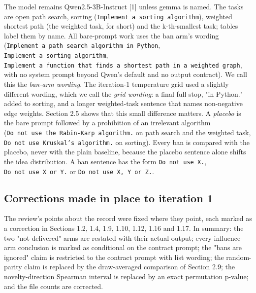 \documentclass[11pt,letterpaper]{article}
\begin{document}
The model remains Qwen2.5-3B-Instruct [1] unless gemma is named. The tasks are open path search, sorting (\texttt{Implement\ a\ sorting\ algorithm}), weighted shortest path (the weighted task, for short) and the k-th-smallest task; tables label them by name. All bare-prompt work uses the ban arm's wording (\texttt{Implement\ a\ path\ search\ algorithm\ in\ Python}, \texttt{Implement\ a\ sorting\ algorithm}, \texttt{Implement\ a\ function\ that\ finds\ a\ shortest\ path\ in\ a\ weighted\ graph}, with no system prompt beyond Qwen's default and no output contract). We call this the \emph{ban-arm wording}. The iteration-1 temperature grid used a slightly different wording, which we call the \emph{grid wording}: a final full stop, "in Python." added to sorting, and a longer weighted-task sentence that names non-negative edge weights. Section 2.5 shows that this small difference matters. A \emph{placebo} is the bare prompt followed by a prohibition of an irrelevant algorithm (\texttt{Do\ not\ use\ the\ Rabin-Karp\ algorithm.} on path search and the weighted task, \texttt{Do\ not\ use\ Kruskal's\ algorithm.} on sorting). Every ban is compared with the placebo, never with the plain baseline, because the placebo sentence alone shifts the idea distribution. A ban sentence has the form \texttt{Do\ not\ use\ X.}, \texttt{Do\ not\ use\ X\ or\ Y.} or \texttt{Do\ not\ use\ X,\ Y\ or\ Z.}.

\subsection{Corrections made in place to iteration 1}
The review's points about the record were fixed where they point, each marked as a correction in Sections 1.2, 1.4, 1.9, 1.10, 1.12, 1.16 and 1.17. In summary: the two "not delivered" arms are restated with their actual output; every influence-arm conclusion is marked as conditional on the contract prompt; the "bans are ignored" claim is restricted to the contract prompt with list wording; the random-parity claim is replaced by the draw-averaged comparison of Section 2.9; the novelty-direction Spearman interval is replaced by an exact permutation p-value; and the file counts are corrected.
\end{document}
